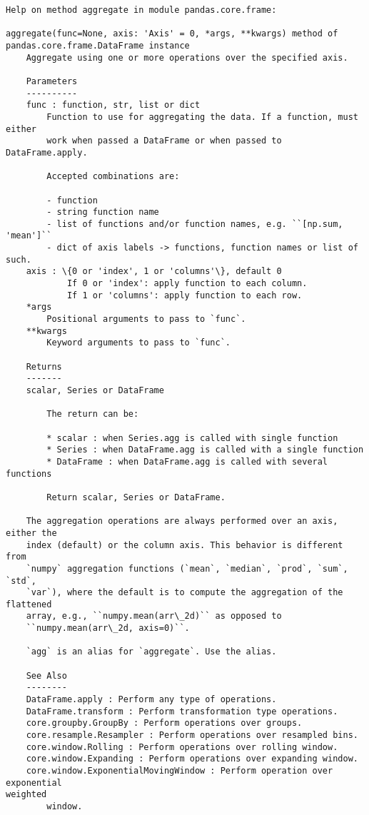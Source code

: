 \documentclass[11pt]{article}
\begin{document}
    \begin{Verbatim}[commandchars=\\\{\}]
Help on method aggregate in module pandas.core.frame:

aggregate(func=None, axis: 'Axis' = 0, *args, **kwargs) method of
pandas.core.frame.DataFrame instance
    Aggregate using one or more operations over the specified axis.

    Parameters
    ----------
    func : function, str, list or dict
        Function to use for aggregating the data. If a function, must either
        work when passed a DataFrame or when passed to DataFrame.apply.

        Accepted combinations are:

        - function
        - string function name
        - list of functions and/or function names, e.g. ``[np.sum, 'mean']``
        - dict of axis labels -> functions, function names or list of such.
    axis : \{0 or 'index', 1 or 'columns'\}, default 0
            If 0 or 'index': apply function to each column.
            If 1 or 'columns': apply function to each row.
    *args
        Positional arguments to pass to `func`.
    **kwargs
        Keyword arguments to pass to `func`.

    Returns
    -------
    scalar, Series or DataFrame

        The return can be:

        * scalar : when Series.agg is called with single function
        * Series : when DataFrame.agg is called with a single function
        * DataFrame : when DataFrame.agg is called with several functions

        Return scalar, Series or DataFrame.

    The aggregation operations are always performed over an axis, either the
    index (default) or the column axis. This behavior is different from
    `numpy` aggregation functions (`mean`, `median`, `prod`, `sum`, `std`,
    `var`), where the default is to compute the aggregation of the flattened
    array, e.g., ``numpy.mean(arr\_2d)`` as opposed to
    ``numpy.mean(arr\_2d, axis=0)``.

    `agg` is an alias for `aggregate`. Use the alias.

    See Also
    --------
    DataFrame.apply : Perform any type of operations.
    DataFrame.transform : Perform transformation type operations.
    core.groupby.GroupBy : Perform operations over groups.
    core.resample.Resampler : Perform operations over resampled bins.
    core.window.Rolling : Perform operations over rolling window.
    core.window.Expanding : Perform operations over expanding window.
    core.window.ExponentialMovingWindow : Perform operation over exponential
weighted
        window.


\end{Verbatim}
\end{document}
